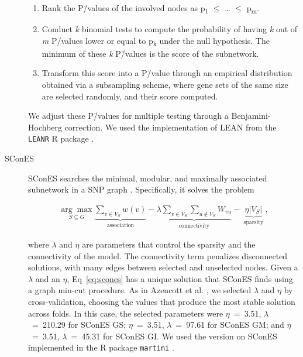 \documentclass[10pt,letterpaper]{article}
\begin{document}
\begin{description}
\begin{enumerate}
\item Rank the P\=/values of the involved nodes as p\textsubscript{1} \(\le\) \dots{} \(\le\) p\textsubscript{m}. 
\item Conduct \emph{k} binomial tests to compute the probability of having \emph{k} out of \emph{m} P\=/values lower or equal to p\textsubscript{k} under the null hypothesis. The minimum of these \emph{k} P\=/values is the score of the subnetwork.
\item Transform this score into a P\=/value through an empirical distribution obtained via a subsampling scheme, where gene sets of the same size are selected randomly, and their score computed. 
\end{enumerate}

We adjust these P\=/values for multiple testing through a Benjamini-Hochberg correction. We used the implementation of LEAN from the \texttt{LEANR} R package \cite{leanr}.

\item[{SConES}] SConES searches the minimal, modular, and maximally associated subnetwork in a SNP graph \cite{azencott_efficient_2013}. Specifically, it solves the problem

\begin{eqnarray}
\label{eq:scones}
\underset{S \subseteq G}{\arg \max } \underbrace{\sum_{v \in V_S} w(v)}_{\text { association }} - \underbrace{\lambda \sum_{v \in V_S} \sum_{u \not\in V_S} {W}_{vu} }_{\text { connectivity }}-\underbrace{\eta \lvert V_S \rvert }_{\text { sparsity }},
\end{eqnarray}

where \(\lambda\) and \(\eta\) are parameters that control the sparsity and the connectivity of the model. The connectivity term penalizes disconnected solutions, with many edges between selected and unselected nodes. Given a $\lambda$ and an $\eta$, Eq~\ref{eq:scones} has a unique solution that SConES finds using a graph min-cut procedure. As in Azencott et al. \cite{azencott_efficient_2013}, we selected \(\lambda\) and \(\eta\) by cross-validation, choosing the values that produce the most stable solution across folds. In this case, the selected parameters were \(\eta\)~=~3.51, \(\lambda\)~=~210.29 for SConES GS; \(\eta\)~=~3.51, \(\lambda\)~=~97.61 for SConES GM; and \(\eta\)~=~3.51, \(\lambda\)~=~45.31 for SConES GI. We used the version on SConES implemented in the R package \texttt{martini} \cite{martini,climente-gonzalezMartiniPackageGenomewide2021}.


\end{description}
\end{document}
